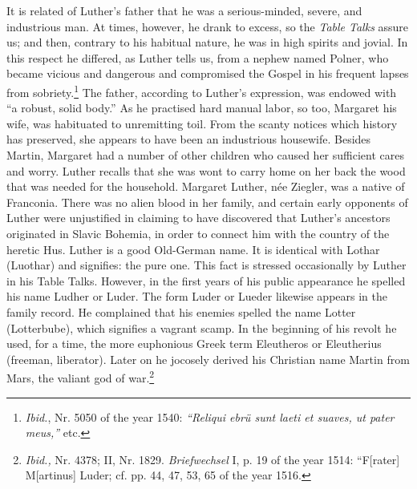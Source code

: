 It is related of Luther’s father that he was a serious-minded, severe,
and industrious man. At times, however, he drank to excess, so the
\textit{Table Talks} assure us; and then, contrary to his habitual nature, he
was in high spirits and jovial. In this respect he differed, as Luther tells
us, from a nephew named Polner, who became vicious and dangerous
and compromised the Gospel in his frequent lapses from sobriety.\footnote{
    \textit{Ibid.}, Nr. 5050 of the year 1540: \textit{“Reliqui ebrü sunt laeti et suaves, ut pater meus,”} etc.}
The father, according to Luther’s expression, was endowed with
“a robust, solid body.” As he practised hard manual labor, so too,
Margaret his wife, was habituated to unremitting toil. From the scanty
notices which history has preserved, she appears to have been an industrious
housewife. Besides Martin, Margaret had a number of other children
who caused her sufficient cares and worry. Luther recalls that she
was wont to carry home on her back the wood that was needed for the
household. Margaret Luther, née Ziegler, was a native of Franconia.
There was no alien blood in her family, and certain early opponents
of Luther were unjustified in claiming to have discovered that
Luther’s ancestors originated in Slavic Bohemia, in order to connect
him with the country of the heretic Hus. Luther is a good Old-German name.
It is identical with Lothar (Luothar) and signifies: the
pure one. This fact is stressed occasionally by Luther in his Table
Talks. However, in the first years of his public appearance he spelled
his name Ludher or Luder. The form Luder or Lueder likewise appears in the family record. He complained that his enemies spelled the
name Lotter (Lotterbube), which signifies a vagrant scamp. In the
beginning of his revolt he used, for a time, the more euphonious
Greek term Eleutheros or Eleutherius (freeman, liberator). Later on
he jocosely derived his Christian name Martin from Mars, the valiant
god of war.\footnote{\textit{Ibid.,} Nr. 4378; II, Nr. 1829. \textit{Briefwechsel} I, p. 19 of the year 1514: “F[rater]
M[artinus] Luder; cf. pp. 44, 47, 53, 65 of the year 1516.
}

